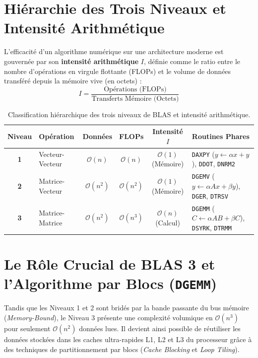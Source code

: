 \documentclass[11pt,a4paper]{report}
\theoremstyle{plain}
\theoremstyle{definition}
\theoremstyle{remark}
\begin{document}
\section{Hiérarchie des Trois Niveaux et Intensité Arithmétique}
L'efficacité d'un algorithme numérique sur une architecture moderne est gouvernée par son \textbf{intensité arithmétique} $I$, définie comme le ratio entre le nombre d'opérations en virgule flottante (FLOPs) et le volume de données transféré depuis la mémoire vive (en octets) :
\begin{equation}
I = \frac{\text{Opérations (FLOPs)}}{\text{Transferts Mémoire (Octets)}}
\end{equation}

\begin{table}[htbp]
\centering
\caption{Classification hiérarchique des trois niveaux de BLAS et intensité arithmétique.}
\label{tab:blas_levels}
\small
\begin{tabularx}{\textwidth}{c l c c c X}
\toprule
\textbf{Niveau} & \textbf{Opération} & \textbf{Données} & \textbf{FLOPs} & \textbf{Intensité $I$} & \textbf{Routines Phares} \\
\midrule
\textbf{1} & Vecteur-Vecteur & $\mathcal{O}(n)$ & $\mathcal{O}(n)$ & $\mathcal{O}(1)$ (Mémoire) & \texttt{DAXPY} ($y \leftarrow \alpha x + y$), \texttt{DDOT}, \texttt{DNRM2} \\
\textbf{2} & Matrice-Vecteur & $\mathcal{O}(n^2)$ & $\mathcal{O}(n^2)$ & $\mathcal{O}(1)$ (Mémoire) & \texttt{DGEMV} ($y \leftarrow \alpha Ax + \beta y$), \texttt{DGER}, \texttt{DTRSV} \\
\textbf{3} & Matrice-Matrice & $\mathcal{O}(n^2)$ & $\mathcal{O}(n^3)$ & $\mathcal{O}(n)$ (Calcul) & \texttt{DGEMM} ($C \leftarrow \alpha AB + \beta C$), \texttt{DSYRK}, \texttt{DTRMM} \\
\bottomrule
\end{tabularx}
\end{table}

\section{Le Rôle Crucial de BLAS 3 et l'Algorithme par Blocs (\texttt{DGEMM})}
Tandis que les Niveaux 1 et 2 sont bridés par la bande passante du bus mémoire (\textit{Memory-Bound}), le Niveau 3 présente une complexité volumique en $\mathcal{O}(n^3)$ pour seulement $\mathcal{O}(n^2)$ données lues. Il devient ainsi possible de réutiliser les données stockées dans les caches ultra-rapides L1, L2 et L3 du processeur grâce à des techniques de partitionnement par blocs (\textit{Cache Blocking} et \textit{Loop Tiling}).
\end{document}
